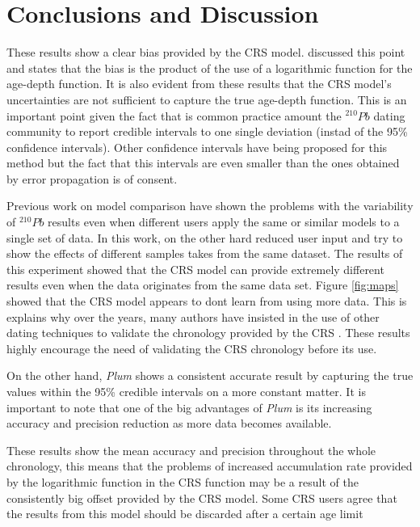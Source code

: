 \documentclass [10pt] {article}
\begin{document}
\section{Conclusions and Discussion}

These results show a clear bias provided by the CRS model. 
\citet{Aquino2018} discussed this point and states that the bias is the product of the use of a logarithmic function for the age-depth function. 
It is also evident from these results that the CRS model's uncertainties are not sufficient to capture the true age-depth function. 
This is an important point given the fact that is common practice amount the $^{210}Pb$ dating community to report credible intervals to one single deviation (instad of the 95\% confidence intervals).
Other confidence intervals have being proposed for this method \citep{Sanchez-Cabeza2014} but the fact that this intervals are even smaller than the ones obtained by error propagation \citep{Appleby2001} is of consent. 

Previous work on model comparison \citep{Barsanti2020} have shown the problems with the variability of $^{210}Pb$ results even when different users apply the same or similar models to a single set of data.
In this work, on the  other hard reduced user input and try to show the effects of different samples takes from the same dataset. 
The results of this experiment showed that the CRS model can provide extremely different results even when the data originates from the same data set. 
Figure \ref{fig:maps} showed that the CRS model appears to dont learn from using more data.
This is explains why over the years, many authors have insisted in the use of other dating techniques to validate the chronology provided by the CRS \citep{Sanchez-Cabeza2012,Barsanti2020,Aquino2020}.
These results highly encourage the need of validating the CRS chronology before its use.

On the other hand, \textit{Plum} shows a consistent accurate result by capturing the true values within the 95\% credible intervals on a more constant matter. 
It is important to note that one of the big advantages of \textit{Plum} is its increasing accuracy and precision reduction as more data becomes available. 

These results show the mean accuracy and precision throughout the whole chronology, this means that the problems of increased accumulation rate provided by the logarithmic function in the CRS function may be a result of the consistently big offset provided by the CRS model.
Some CRS users agree that the results from this model should be discarded after a certain age limit
\end{document}
